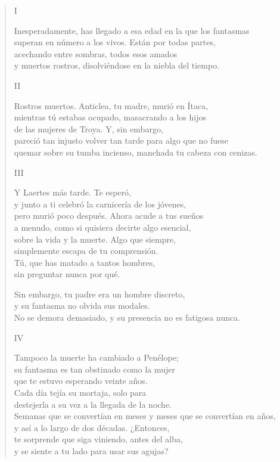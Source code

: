 \documentclass[11pt,a4paper]{article}
\begin{document}
\begin{verse}
I

Inesperadamente, has llegado a esa edad en la que los fantasmas\\
superan en número a los vivos. Están por todas partes,\\
acechando entre sombras, todos esos amados\\
y muertos rostros, disolviéndose en la niebla del tiempo.

II

Rostros muertos. Anticlea, tu madre, murió en Ítaca,\\
mientras tú estabas ocupado, masacrando a los hijos\\
de las mujeres de Troya. Y, sin embargo,\\
pareció tan injusto volver tan tarde para algo que no fuese\\
quemar sobre su tumba incienso, manchada tu cabeza con cenizas.

III

Y Laertes más tarde. Te esperó,\\
y junto a ti celebró la carnicería de los jóvenes,\\
pero murió poco después. Ahora acude a tus sueños\\
a menudo, como si quisiera decirte algo esencial,\\
sobre la vida y la muerte. Algo que siempre,\\
simplemente escapa de tu comprensión.\\
Tú, que has matado a tantos hombres,\\
sin preguntar nunca por qué.

Sin embargo, tu padre era un hombre discreto,\\
y su fantasma no olvida sus modales.\\
No se demora demasiado, y su presencia no es fatigosa nunca.

IV

Tampoco la muerte ha cambiado a Penélope;\\
su fantasma es tan obstinado como la mujer\\
que te estuvo esperando veinte años.\\
Cada día tejía su mortaja, solo para\\
destejerla a su vez a la llegada de la noche.\\
Semanas que se convertían en meses y meses que se convertían en años,\\
y así a lo largo de dos décadas. ¿Entonces,\\
te sorprende que siga viniendo, antes del alba,\\
y se siente a tu lado para usar sus agujas?


\end{verse}
\end{document}
